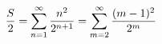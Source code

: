 \documentclass[preview]{standalone}
\begin{document}
\begin{align*}
\special{dvisvgm:raw <g id='unique000'>}\dfrac{S}{2}=\displaystyle\sum_{n=1}^{\infty}\dfrac{n^2}{2^{n+1}}=\sum_{m=2}^{\infty}\dfrac{(m-1)^2}{2^m}\special{dvisvgm:raw </g>}
\end{align*}
\end{document}
